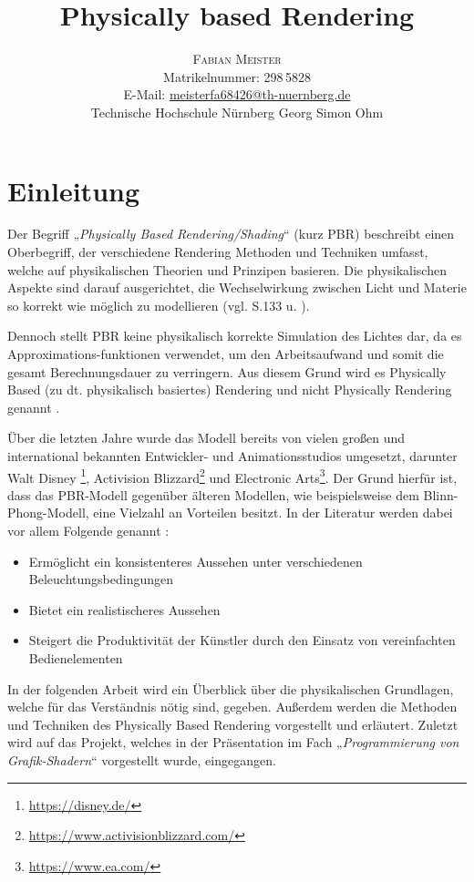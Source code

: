 \documentclass[
  11pt,
  a4paper,
  oneside
  ]{article}
\title{Physically based Rendering} %
\author{%
\textsc{Fabian Meister} \\[1ex] %
\normalsize Matrikelnummer: 298\,5828 \\ %
\normalsize E-Mail: \href{mailto:meisterfa68426@th-nuernberg.de}{meisterfa68426@th-nuernberg.de} \\%
\normalsize Technische Hochschule Nürnberg Georg Simon Ohm \\ %
}
\date{} %
\begin{document}
\maketitle


\section{Einleitung}
Der Begriff „\textit{Physically Based Rendering/Shading}“ (kurz PBR) beschreibt einen Oberbegriff, der verschiedene Rendering Methoden und Techniken umfasst, welche auf physikalischen Theorien und Prinzipen basieren. Die physikalischen Aspekte sind darauf ausgerichtet, die Wechselwirkung zwischen Licht und Materie so korrekt wie möglich zu modellieren
(vgl. S.133 \cite{openGlWolf} u. \cite{learnOpenGL}).

Dennoch stellt PBR keine physikalisch korrekte Simulation des Lichtes dar, da es Approximations-funktionen verwendet, um den Arbeitsaufwand und somit die gesamt Berechnungsdauer zu verringern. Aus diesem Grund wird es Physically Based (zu dt. physikalisch basiertes) Rendering und nicht Physically Rendering genannt
\cite{learnOpenGL}.

Über die letzten Jahre wurde das Modell bereits von vielen großen und international bekannten Entwickler- und Animationsstudios umgesetzt, darunter Walt Disney
\footnote{\url{https://disney.de/}}, Activision Blizzard\footnote{\url{https://www.activisionblizzard.com/}} und Electronic Arts\footnote{\url{https://www.ea.com/}}. 
Der Grund hier\-für ist, dass das PBR-Modell gegenüber älteren Modellen, wie beispielsweise dem Blinn-Phong-Modell, eine Vielzahl an Vorteilen besitzt. In der Literatur werden dabei vor allem Folgende genannt 
\cite{reasonsForPbr1,reasonsForPbr2,pbrGuide,learnOpenGL}:
\begin{itemize}
  \item Ermöglicht ein konsistenteres Aussehen unter verschiedenen Beleuchtungsbedingungen 
  \item Bietet ein realistischeres Aussehen
  \item Steigert die Produktivität der Künstler durch den Einsatz von vereinfachten Bedienelementen
\end{itemize}

In der folgenden Arbeit wird ein Überblick über die physikalischen Grundlagen, welche für das Verständnis nötig sind, gegeben. Außerdem werden die Methoden und Techniken des Physically Based Rendering vorgestellt und erläutert. Zuletzt wird auf das Projekt, welches in der Präsentation im Fach „\textit{Programmierung von Grafik-Shadern}“ vorgestellt wurde, eingegangen. 
\end{document}
